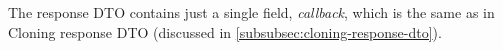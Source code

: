 \documentclass[../main.tex]{subfiles}
\begin{document}
The response DTO contains just a single field, \textit{callback}, which is the same as in Cloning response DTO (discussed in \ref{subsubsec:cloning-response-dto}).
\end{document}

